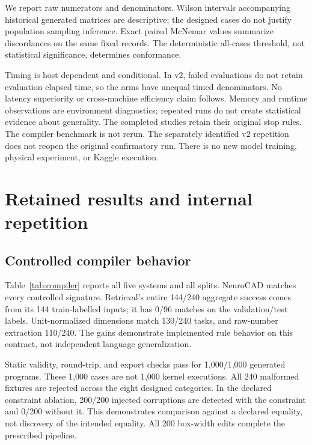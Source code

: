\documentclass[10pt]{article}
\begin{document}
We report raw numerators and denominators. Wilson intervals accompanying
historical generated matrices are descriptive; the designed cases do not
justify population sampling inference. Exact paired McNemar values summarize
discordances on the same fixed records. The deterministic all-cases threshold,
not statistical significance, determines conformance.

Timing is host dependent and conditional. In v2, failed evaluations do not
retain evaluation elapsed time, so the arms have unequal timed denominators.
No latency superiority or cross-machine efficiency claim follows. Memory and
runtime observations are environment diagnostics; repeated runs do not create
statistical evidence about generality. The completed studies retain their
original stop rules. The compiler benchmark is not rerun. The separately
identified v2 repetition does not reopen the original confirmatory run.
There is no new model training, physical experiment, or Kaggle execution.

\section{Retained results and internal repetition}

\subsection{Controlled compiler behavior}

\begin{table}[t]
\centering
\caption{Exact semantic matches in the retained generated compiler matrix.
Train-labelled retrieval cases are in-sample. All columns remain controlled
grammar cases. Generated directly from the per-task records.}
\label{tab:compiler}
\small

\end{table}

Table~\ref{tab:compiler} reports all five systems and all splits. NeuroCAD
matches every controlled signature. Retrieval's entire 144/240 aggregate
success comes from its 144 train-labelled inputs; it has 0/96 matches on the
validation/test labels. Unit-normalized dimensions match 130/240 tasks, and
raw-number extraction 110/240. The gains demonstrate implemented rule
behavior on this contract, not independent language generalization.

Static validity, round-trip, and export checks pass for 1,000/1,000 generated
programs. These 1,000 cases are not 1,000 kernel executions. All 240 malformed
fixtures are rejected across the eight designed categories. In the declared
constraint ablation, 200/200 injected corruptions are detected with the
constraint and 0/200 without it. This demonstrates comparison against a
declared equality, not discovery of the intended equality. All 200 box-width
edits complete the prescribed pipeline.
\end{document}
